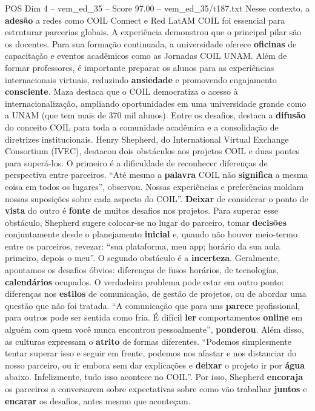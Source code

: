 \begin{textsample}{POS Dim 4 – vem\_ed\_35 – Score 97.00 – vem\_ed\_35/t187.txt}
Nesse contexto, a \textbf{adesão} a redes como COIL Connect e Red LatAM COIL foi essencial para estruturar parcerias globais.
A experiência demonstrou que o principal pilar são os docentes.
Para sua formação continuada, a universidade oferece \textbf{oficinas} de capacitação e eventos acadêmicos como as Jornadas COIL UNAM.
Além de formar professores, é importante preparar os alunos para as experiências internacionais virtuais, reduzindo \textbf{ansiedade} e promovendo engajamento \textbf{consciente}.
Maza destaca que o COIL democratiza o acesso à internacionalização, ampliando oportunidades em uma universidade grande como a UNAM (que tem mais de 370 mil alunos).
Entre os desafios, destaca a \textbf{difusão} do conceito COIL para toda a comunidade acadêmica e a consolidação de diretrizes institucionais.
Henry Shepherd, do International Virtual Exchange Consortium (IVEC), destacou dois obstáculos aos projetos COIL e duas pontes para superá-los.
O primeiro é a dificuldade de reconhecer diferenças de perspectiva entre parceiros. “Até mesmo a \textbf{palavra} COIL não \textbf{significa} a mesma coisa em todos os lugares”, observou.
Nossas experiências e preferências moldam nossas suposições sobre cada aspecto do COIL”. \textbf{Deixar} de considerar o ponto de \textbf{vista} do outro é \textbf{fonte} de muitos desafios nos projetos.
Para superar esse obstáculo, Shepherd sugere colocar-se no lugar do parceiro, tomar \textbf{decisões} conjuntamente desde o planejamento \textbf{inicial} e, quando não houver meio-termo entre os parceiros, revezar: “sua plataforma, meu app; horário da sua aula primeiro, depois o meu”.
O segundo obstáculo é a \textbf{incerteza}.
Geralmente, apontamos os desafios óbvios: diferenças de fusos horários, de tecnologias, \textbf{calendários} ocupados.
O verdadeiro problema pode estar em outro ponto: diferenças nos \textbf{estilos} de comunicação, de gestão de projetos, ou de abordar uma questão que não foi tratada. “A comunicação que para uns \textbf{parece} profissional, para outros pode ser sentida como fria.
É difícil \textbf{ler} comportamentos \textbf{online} em alguém com quem você nunca encontrou pessoalmente”, \textbf{ponderou}.
Além disso, as culturas expressam o \textbf{atrito} de formas diferentes. “Podemos simplesmente tentar superar isso e seguir em frente, podemos nos afastar e nos distanciar do nosso parceiro, ou ir embora sem dar explicações e \textbf{deixar} o projeto ir por \textbf{água} abaixo.
Infelizmente, tudo isso acontece no COIL”.
Por isso, Shepherd \textbf{encoraja} os parceiros a conversarem sobre expectativas sobre como vão trabalhar \textbf{juntos} e \textbf{encarar} os desafios, antes mesmo que aconteçam.

\end{textsample}
